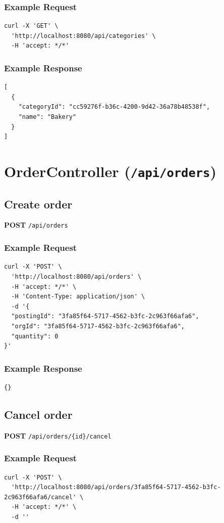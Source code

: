 \documentclass[a4paper,11pt]{article}
\begin{document}
\subsubsection*{Example Request}
\begin{lstlisting}
curl -X 'GET' \
  'http://localhost:8080/api/categories' \
  -H 'accept: */*'
\end{lstlisting}

\subsubsection*{Example Response}
\begin{lstlisting}
[
  {
    "categoryId": "cc59276f-b36c-4200-9d42-36a78b48538f",
    "name": "Bakery"
  }
]
\end{lstlisting}

\section{OrderController (\texttt{/api/orders})}

\subsection{Create order}
\textbf{POST} \texttt{/api/orders}
\subsubsection*{Example Request}
\begin{lstlisting}
curl -X 'POST' \
  'http://localhost:8080/api/orders' \
  -H 'accept: */*' \
  -H 'Content-Type: application/json' \
  -d '{
  "postingId": "3fa85f64-5717-4562-b3fc-2c963f66afa6",
  "orgId": "3fa85f64-5717-4562-b3fc-2c963f66afa6",
  "quantity": 0
}'
\end{lstlisting}

\subsubsection*{Example Response}
\begin{lstlisting}
{}
\end{lstlisting}

\subsection{Cancel order}
\textbf{POST} \texttt{/api/orders/\{id\}/cancel}
\subsubsection*{Example Request}
\begin{lstlisting}
curl -X 'POST' \
  'http://localhost:8080/api/orders/3fa85f64-5717-4562-b3fc-2c963f66afa6/cancel' \
  -H 'accept: */*' \
  -d ''
\end{lstlisting}
\end{document}
